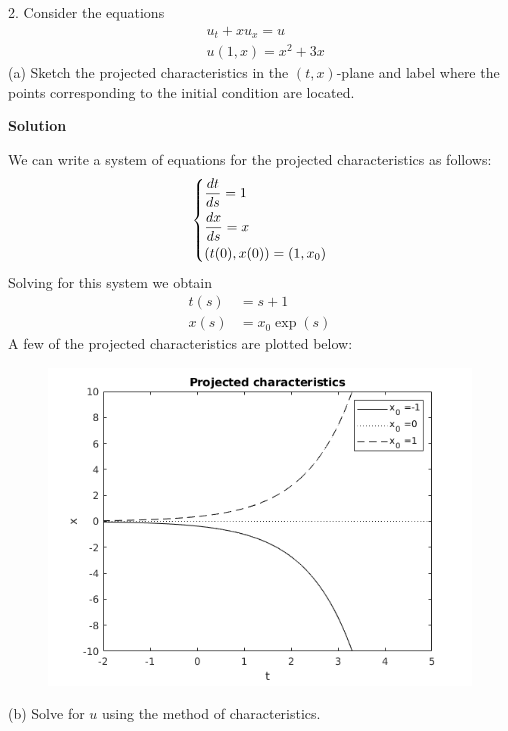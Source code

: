 \documentclass{article}
\begin{document}
\vspace{5mm}
2. Consider the equations
%
\begin{equation}
    \begin{aligned}
        &u_{t} + x u_{x} = u \\
        &u(1, x) = x^2 + 3 x
    \end{aligned}
    \label{eq:p1q2}
\end{equation}
%
(a) Sketch the projected characteristics in the $(t, x)$-plane and label
where the points corresponding to the initial condition are located.

\textbf{Solution}

We can write a system of equations for the projected characteristics as
follows:
%
\begin{equation*}
    \begin{dcases}
        \frac{d t}{d s} = 1 \\
        \frac{d x}{d s} = x \\
        \left( t(0), x(0) \right) = \left( 1, x_0 \right)
    \end{dcases}
\end{equation*}
%
Solving for this system we obtain
%
\begin{align*}
    t(s) &= s + 1 \\
    x(s) &= x_0 \exp(s)
\end{align*}
%
A few of the projected characteristics are plotted below:
%
\begin{figure}[H]
    \centering
    \includegraphics[width=12cm]{p1q2}
\end{figure}

\vspace{5mm}
(b) Solve for $u$ using the method of characteristics.
\end{document}
